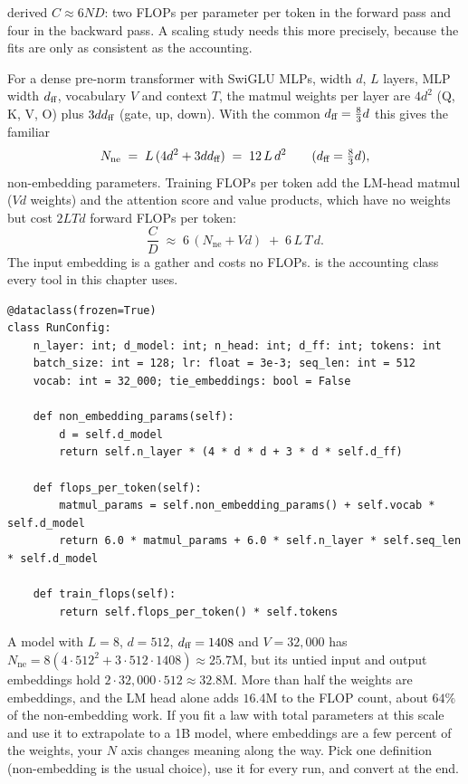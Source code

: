  derived $C\approx 6ND$: two FLOPs per parameter per token in the
forward pass and four in the backward pass. A scaling study needs this more precisely, because
the fits are only as consistent as the accounting.

For a dense pre-norm transformer with SwiGLU MLPs, width $d$, $L$ layers, MLP width $d_{\text{ff}}$,
vocabulary $V$ and context $T$, the matmul weights per layer are $4d^2$ (Q, K, V, O) plus
$3dd_{\text{ff}}$ (gate, up, down). With the common $d_{\text{ff}} = \tfrac83 d$ this gives the familiar
\begin{equation}
N_{\text{ne}} \;=\; L\,(4d^2 + 3dd_{\text{ff}}) \;=\; 12\,L\,d^2 \qquad(d_{\text{ff}}=\tfrac83d),
\label{eq:scalinglaws:12ld2}
\end{equation}
non-embedding parameters. Training FLOPs per token add the LM-head matmul ($Vd$ weights) and the
attention score and value products, which have no weights but cost $2LTd$ forward FLOPs per
token:
\begin{equation}
\frac{C}{D} \;\approx\; 6\,(N_{\text{ne}} + Vd) \;+\; 6\,L\,T\,d.
\label{eq:scalinglaws:fpt}
\end{equation}
The input embedding is a gather and costs no FLOPs.  is the
accounting class every tool in this chapter uses.

\begin{lstlisting}[caption={Accounting for one run (from \code{llmsys/scaling.py}). Everything in this chapter---planning, fitting, the synthetic API---derives $N$ and $C$ from this one place.},label={lst:scalinglaws:runconfig}]
@dataclass(frozen=True)
class RunConfig:
    n_layer: int; d_model: int; n_head: int; d_ff: int; tokens: int
    batch_size: int = 128; lr: float = 3e-3; seq_len: int = 512
    vocab: int = 32_000; tie_embeddings: bool = False

    def non_embedding_params(self):
        d = self.d_model
        return self.n_layer * (4 * d * d + 3 * d * self.d_ff)

    def flops_per_token(self):
        matmul_params = self.non_embedding_params() + self.vocab * self.d_model
        return 6.0 * matmul_params + 6.0 * self.n_layer * self.seq_len * self.d_model

    def train_flops(self):
        return self.flops_per_token() * self.tokens
\end{lstlisting}

\begin{napkinmath}
A model with $L=8$, $d=512$, $d_{\text{ff}}=1408$ and $V=32{,}000$ has
$N_{\text{ne}} = 8(4\cdot512^2 + 3\cdot512\cdot1408) \approx 25.7$M, but its untied input
and output embeddings hold $2\cdot32{,}000\cdot512\approx 32.8$M. More than half the weights
are embeddings, and the LM head alone adds $16.4$M to the FLOP count, about $64\%$ of the
non-embedding work. If you fit a law with total parameters at this scale and use it to
extrapolate to a 1B model, where embeddings are a few percent of the weights, your $N$ axis
changes meaning along the way. Pick one definition (non-embedding is the usual choice), use it
for every run, and convert at the end.
\end{napkinmath}

